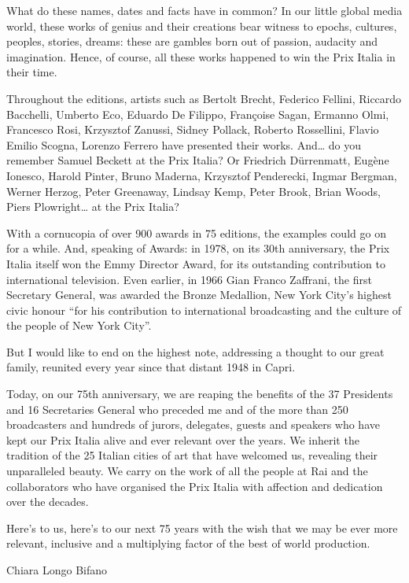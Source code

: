 {{What do these names, dates and facts have in common? In our little global media world, these works of genius and their creations bear witness to epochs, cultures, peoples, stories, dreams: these are gambles born out of passion, audacity and imagination. Hence, of course, all these works happened to win the Prix Italia in their time.

Throughout the editions, artists such as Bertolt Brecht, Federico Fellini, Riccardo Bacchelli, Umberto Eco, Eduardo De Filippo, Françoise Sagan, Ermanno Olmi, Francesco Rosi, Krzysztof Zanussi, Sidney Pollack, Roberto Rossellini, Flavio Emilio Scogna, Lorenzo Ferrero have presented their works. And\dots{} do you remember Samuel Beckett at the Prix Italia? Or Friedrich Dürrenmatt, Eugène Ionesco, Harold Pinter, Bruno Maderna, Krzysztof Penderecki, Ingmar Bergman, Werner Herzog, Peter Greenaway, Lindsay Kemp, Peter Brook, Brian Woods, Piers Plowright\dots{} at the Prix Italia?

With a cornucopia of over 900 awards in 75 editions, the examples could go on for a while. And, speaking of Awards: in 1978, on its 30th anniversary, the Prix Italia itself won the Emmy Director Award, for its outstanding contribution to international television. Even earlier, in 1966 Gian Franco Zaffrani, the first Secretary General, was awarded the Bronze Medallion, New York City's highest civic honour ``for his contribution to international broadcasting and the culture of the people of New York City''. 

But I would like to end on the highest note, addressing a thought to our great family, reunited every year since that distant 1948 in Capri. 

Today, on our 75th anniversary, we are reaping the benefits of the 37 Presidents and 16 Secretaries General who preceded me and of the more than 250 broadcasters and hundreds of jurors, delegates, guests and speakers who have kept our Prix Italia alive and ever relevant over the years. We inherit the tradition of the 25 Italian cities of art that have welcomed us, revealing their unparalleled beauty. We carry on the work of all the people at Rai and the collaborators who have organised the Prix Italia with affection and dedication over the decades. 

Here's to us, here's to our next 75 years with the wish that we may be ever more relevant, inclusive and a multiplying factor of the best of world production.
\par\bigskip\par
\noindent Chiara Longo Bifano

}}
